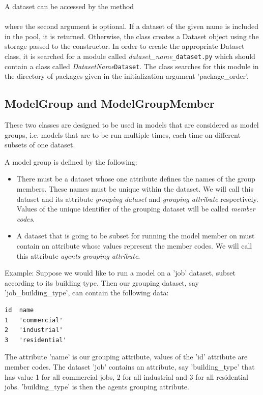 A dataset can be accessed by the method \\
\\
 where the second argument is optional.
If a dataset of the given name is included in the pool, it is returned. Otherwise, the class creates a Dataset object using
the storage passed to the constructor. In order to create the appropriate Dataset class, it is searched
for a module called {\em dataset_name}\verb|_dataset.py| which should contain a class called {\em DatasetName}\verb|Dataset|.
The  class searches for this module in the directory  of packages given in the initialization argument
'package_order'.

\subsection{ModelGroup and ModelGroupMember}
%
\label{sec:model-group}
%
These two classes are designed to be used in models that are considered as model groups, i.e. models that are to be run
multiple times, each time on different subsets of one dataset.

A model group is defined by the following:
\begin{itemize}
\item There must be a dataset whose one attribute defines the names of the group members.
These names must be unique within the dataset.
We will call this dataset and its attribute {\em grouping dataset} and {\em grouping attribute} respectively.
Values of the unique identifier of the grouping dataset will be called  {\em member codes}.
\item A dataset that is going to be subset for running the model member on must contain an attribute whose values
represent the member codes. We will call this attribute {\em agents grouping attribute}.
\end{itemize}

Example: Suppose we would like to run a model on a 'job' dataset, subset according to its building type. Then
our grouping dataset, say 'job_building_type', can contain the following data:
\begin{verbatim}
id	name
1	'commercial'
2	'industrial'
3	'residential'
\end{verbatim}
The attribute 'name' is our grouping attribute, values of the 'id' attribute are member codes.
The dataset 'job' contains an attribute, say 'building_type' that has
value 1 for all commercial jobs, 2 for all industrial and 3 for all residential jobs. 'building_type' is then the
agents grouping attribute.

